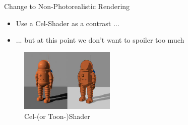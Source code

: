 \documentclass{beamer}
\begin{document}
\begin{frame}{Change to Non-Photorealistic Rendering}
\begin{minipage}[hbt]{0.45\textwidth}
	\begin{itemize}
		\item Use a Cel-Shader as a contrast ...
		\item ... but at this point we don't want to spoiler too much
	\end{itemize}	
\end{minipage}
\begin{minipage}[hbt]{0.45\textwidth}
	\begin{figure}
	\centering
	\includegraphics[width=4.5cm]{figures/toon_shader.jpg}
	\caption{Cel-(or Toon-)Shader}
	\end{figure}
\end{minipage}
\end{frame}
\end{document}
